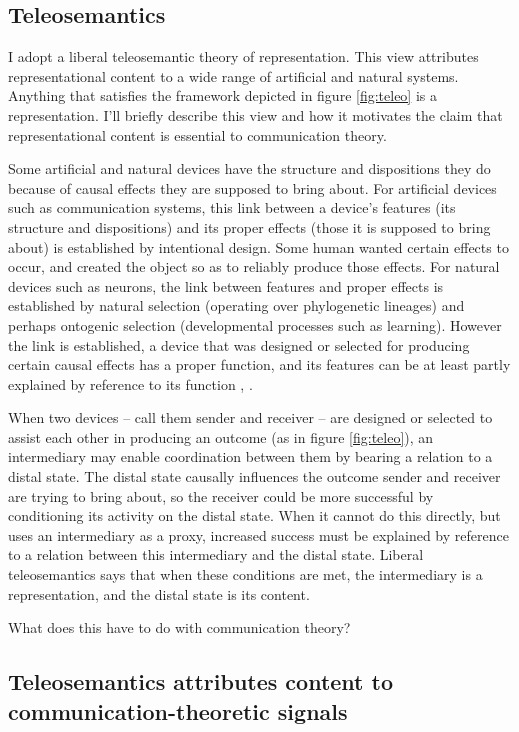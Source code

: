 \documentclass[12pt]{article}
\begin{document}
\subsection{Teleosemantics}
I adopt a liberal teleosemantic theory of representation.
This view attributes representational content to a wide range of artificial and natural systems.
Anything that satisfies the framework depicted in figure \ref{fig:teleo} is a representation.
I'll briefly describe this view and how it motivates the claim that representational content is essential to communication theory.



Some artificial and natural devices have the structure and dispositions they do because of causal effects they are supposed to bring about.
For artificial devices such as communication systems, this link between a device's features (its structure and dispositions) and its proper effects (those it is supposed to bring about) is established by intentional design.
Some human wanted certain effects to occur, and created the object so as to reliably produce those effects.
For natural devices such as neurons, the link between features and proper effects is established by natural selection (operating over phylogenetic lineages) and perhaps ontogenic selection (developmental processes such as learning).
However the link is established, a device that was designed or selected for producing certain causal effects has a proper function, and its features can be at least partly explained by reference to its function \citep[$\SS$1-2]{millikan1984language}, \citep[$\S$2]{millikan1993white}.

When two devices -- call them sender and receiver -- are designed or selected to assist each other in producing an outcome (as in figure \ref{fig:teleo}), an intermediary may enable coordination between them by bearing a relation to a distal state.
The distal state causally influences the outcome sender and receiver are trying to bring about, so the receiver could be more successful by conditioning its activity on the distal state.
When it cannot do this directly, but uses an intermediary as a proxy, increased success must be explained by reference to a relation between this intermediary and the distal state.
Liberal teleosemantics says that when these conditions are met, the intermediary is a representation, and the distal state is its content.

What does this have to do with communication theory?

\subsection{Teleosemantics attributes content to communication-theoretic signals}
\end{document}
